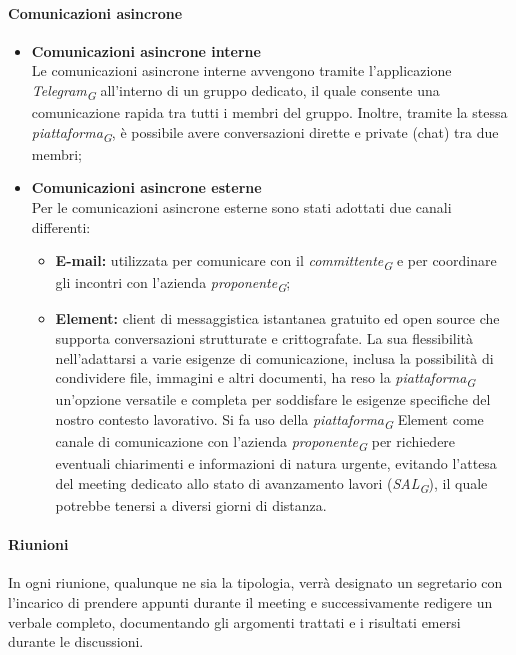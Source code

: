 \paragraph{Comunicazioni asincrone}
\begin{itemize}
  \item \textbf{Comunicazioni asincrone interne} \\
  Le comunicazioni asincrone interne avvengono tramite l'applicazione \textit{Telegram}\textsubscript{\textit{G}} all'interno di un gruppo dedicato, il quale consente una comunicazione rapida tra tutti i membri del gruppo. Inoltre, tramite la stessa \textit{piattaforma}\textsubscript{\textit{G}}, è possibile avere conversazioni dirette e private (chat) tra due membri;
  
  \item \textbf{Comunicazioni asincrone esterne} \\
  Per le comunicazioni asincrone esterne sono stati adottati due canali differenti:
  \begin{itemize}
    \item \textbf{E-mail:} utilizzata per comunicare con il \textit{committente}\textsubscript{\textit{G}} e per coordinare gli incontri con l'azienda \textit{proponente}\textsubscript{\textit{G}};
    \item \textbf{Element:} client di messaggistica istantanea gratuito ed open source che supporta conversazioni strutturate e crittografate. La sua flessibilità nell'adattarsi a varie esigenze di comunicazione, inclusa la possibilità di condividere file, immagini e altri documenti, ha reso la \textit{piattaforma}\textsubscript{\textit{G}} un'opzione versatile e completa per soddisfare le esigenze specifiche del nostro contesto lavorativo. Si fa uso della \textit{piattaforma}\textsubscript{\textit{G}} Element come canale di comunicazione con l'azienda \textit{proponente}\textsubscript{\textit{G}} per richiedere eventuali chiarimenti e informazioni di natura urgente, evitando l'attesa del meeting dedicato allo stato di avanzamento lavori (\textit{SAL}\textsubscript{\textit{G}}), il quale potrebbe tenersi a diversi giorni di distanza.
  \end{itemize}
\end{itemize}

\paragraph*{Riunioni}
In ogni riunione, qualunque ne sia la tipologia, verrà designato un segretario con l'incarico di prendere appunti durante il meeting e successivamente redigere un verbale completo, documentando gli argomenti trattati e i risultati emersi durante le discussioni.

